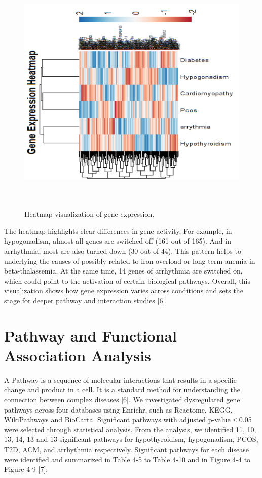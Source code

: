 \begin{figure}[H]
\centering
\includegraphics[height=12cm]{./fig/fig4_3.png} 
\centering
\caption{Heatmap visualization of gene expression.}
\label{Heatmap}
\end{figure}

The heatmap highlights clear differences in gene activity. For example, in hypogonadism, almost all genes are switched off (161 out of 165). And in arrhythmia, most are also turned down (30 out of 44). This pattern helps to underlying the causes of possibly related to iron overload or long-term anemia in beta-thalassemia. At the same time, 14 genes of arrhythmia are switched on, which could point to the activation of certain biological pathways. Overall, this visualization shows how gene expression varies across conditions and sets the stage for deeper pathway and interaction studies [6].


\section{Pathway and Functional Association Analysis}
\label{sec:sec4_3_3}

A Pathway is a sequence of molecular interactions that results in a specific change and product in a cell. It is a standard method for understanding the connection between complex diseases [6]. We investigated dysregulated gene pathways across four databases using Enrichr, such as Reactome, KEGG, WikiPathways and BioCarta. Significant pathways with adjusted p-value ≤ 0.05 were selected through statistical analysis.
From the analysis, we identified 11, 10, 13, 14, 13 and 13 significant pathways for hypothyroidism, hypogonadism, PCOS, T2D, ACM, and arrhythmia respectively. Significant pathways for each disease were identified and summarized in Table 4-5 to Table 4-10 and in Figure 4-4 to Figure 4-9 [7]:\\

